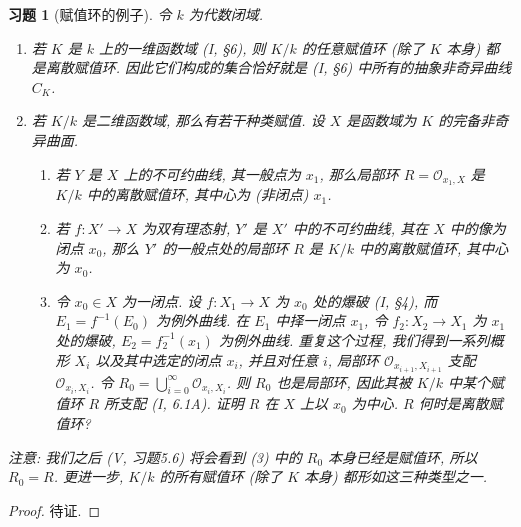 \documentclass{article}
\theoremstyle{exercise}
\newtheorem{exercise}{习题}[section]
\theoremstyle{plain}
\theoremstyle{remark}
\def\cO{\mathscr{O}}
\begin{document}
\begin{exercise}[赋值环的例子]
  令 $k$ 为代数闭域.
  \begin{enumerate}[label=(\alph*)]
    \item 若 $K$ 是 $k$ 上的一维函数域 (I, \S6),
          则 $K/k$ 的任意赋值环 (除了 $K$ 本身) 都是离散赋值环.
          因此它们构成的集合恰好就是 (I, \S6) 中所有的抽象非奇异曲线 $C_K$.
    \item 若 $K/k$ 是二维函数域, 那么有若干种类赋值. 设 $X$ 是函数域为 $K$ 的完备非奇异曲面.
          \begin{enumerate}[label=(\arabic*)]
            \item 若 $Y$ 是 $X$ 上的不可约曲线, 其一般点为 $x_1$, 那么局部环 $R = \cO_{x_1, X}$ 是 $K/k$ 中的离散赋值环, 其中心为 (非闭点) $x_1$.
            \item 若 $f \colon X' \to X$ 为双有理态射, $Y'$ 是 $X'$ 中的不可约曲线, 其在 $X$ 中的像为闭点 $x_0$,
                  那么 $Y'$ 的一般点处的局部环 $R$ 是 $K/k$ 中的离散赋值环, 其中心为 $x_0$.
            \item 令 $x_0 \in X$ 为一闭点. 设 $f \colon X_1 \to X$ 为 $x_0$ 处的爆破 (I, \S4), 而 $E_1 = f^{-1}(E_0)$ 为例外曲线.
                  在 $E_1$ 中择一闭点 $x_1$, 令 $f_2 \colon X_2 \to X_1$ 为 $x_1$ 处的爆破, $E_2 = f_2^{-1}(x_1)$ 为例外曲线.
                  重复这个过程, 我们得到一系列概形 $X_i$ 以及其中选定的闭点 $x_i$, 并且对任意 $i$, 局部环 $\cO_{x_{i+1}, X_{i+1}}$ 支配 $\cO_{x_i, X_i}$.
                  令 $R_0 = \bigcup_{i = 0}^\infty \cO_{x_i, X_i}$. 则 $R_0$ 也是局部环, 因此其被 $K/k$ 中某个赋值环 $R$ 所支配 (I, 6.1A).
                  证明 $R$ 在 $X$ 上以 $x_0$ 为中心. $R$ 何时是离散赋值环?
          \end{enumerate}
  \end{enumerate}
  \textit{注意:} 我们之后 (V, 习题5.6) 将会看到 (3) 中的 $R_0$ 本身已经是赋值环, 所以 $R_0 = R$. 更进一步, $K/k$ 的所有赋值环 (除了 $K$ 本身) 都形如这三种类型之一.
\end{exercise}

\begin{proof}
  待证. \def\qedsymbol{}
\end{proof}
\end{document}
